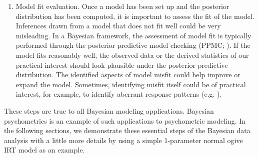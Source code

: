 \documentclass[floatsintext, man]{apa7}
\begin{document}
\begin{enumerate}
  \item Model fit evaluation. Once a model has been set up and the posterior
  distribution has been computed, it is important to assess the fit of the
  model. Inferences drawn from a model that does not fit well could be very
  misleading. In a Bayesian framework, the assessment of model fit is typically
  performed through the posterior predictive model checking (PPMC; 
  \cite{gelman_bayesian_2013,rubin_bayesianly_1984}). If the model fits
  reasonably well, the observed data or
  the derived statistics of our practical interest should look plausible under
  the posterior predictive distribution. The identified aspects of model misfit
  could help improve or expand the model. Sometimes, identifying misfit itself
  could be of practical interest, for example, to identify aberrant response
  patterns (e.g. \cite{sinharay_assessment_2015}).
\end{enumerate}

These steps are true to all Bayesian modeling applications. Bayesian
psychometrics is an example of such applications to psychometric modeling. 
In the following sections, we demonstrate these essential steps of the Bayesian
data analysis with a little more details by using a simple 1-parameter normal
ogive IRT model as an example.
\end{document}
